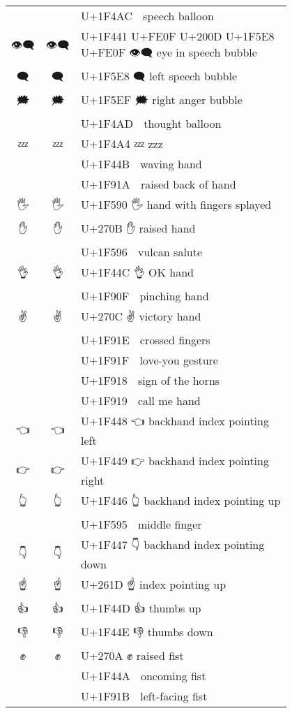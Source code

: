 \documentclass[a4paper,12pt]{ltjarticle}
\newcommand{\fontA}[1]{{\fontspec[RawFeature={mode=harf,+dist,+ccmp}]{Segoe UI Emoji} #1}}
\newcommand{\fontB}[1]{{\fontspec[RawFeature={mode=harf,+dist,+ccmp}]{Noto Color Emoji} #1}}
\begin{document}
\begin{longtable}[c]{ccp{0.8\linewidth}}
\fontA{💬}&\fontB{💬}&U+1F4AC 💬 speech balloon\\
\fontA{👁️‍🗨️}&\fontB{👁️‍🗨️}&U+1F441 U+FE0F U+200D U+1F5E8 U+FE0F 👁️‍🗨️ eye in speech bubble\\
\fontA{🗨}&\fontB{🗨}&U+1F5E8 🗨 left speech bubble\\
\fontA{🗯}&\fontB{🗯}&U+1F5EF 🗯 right anger bubble\\
\fontA{💭}&\fontB{💭}&U+1F4AD 💭 thought balloon\\
\fontA{💤}&\fontB{💤}&U+1F4A4 💤 zzz\\
\fontA{👋}&\fontB{👋}&U+1F44B 👋 waving hand\\
\fontA{🤚}&\fontB{🤚}&U+1F91A 🤚 raised back of hand\\
\fontA{🖐}&\fontB{🖐}&U+1F590 🖐 hand with fingers splayed\\
\fontA{✋}&\fontB{✋}&U+270B ✋ raised hand\\
\fontA{🖖}&\fontB{🖖}&U+1F596 🖖 vulcan salute\\
\fontA{👌}&\fontB{👌}&U+1F44C 👌 OK hand\\
\fontA{🤏}&\fontB{🤏}&U+1F90F 🤏 pinching hand\\
\fontA{✌}&\fontB{✌}&U+270C ✌ victory hand\\
\fontA{🤞}&\fontB{🤞}&U+1F91E 🤞 crossed fingers\\
\fontA{🤟}&\fontB{🤟}&U+1F91F 🤟 love-you gesture\\
\fontA{🤘}&\fontB{🤘}&U+1F918 🤘 sign of the horns\\
\fontA{🤙}&\fontB{🤙}&U+1F919 🤙 call me hand\\
\fontA{👈}&\fontB{👈}&U+1F448 👈 backhand index pointing left\\
\fontA{👉}&\fontB{👉}&U+1F449 👉 backhand index pointing right\\
\fontA{👆}&\fontB{👆}&U+1F446 👆 backhand index pointing up\\
\fontA{🖕}&\fontB{🖕}&U+1F595 🖕 middle finger\\
\fontA{👇}&\fontB{👇}&U+1F447 👇 backhand index pointing down\\
\fontA{☝}&\fontB{☝}&U+261D ☝ index pointing up\\
\fontA{👍}&\fontB{👍}&U+1F44D 👍 thumbs up\\
\fontA{👎}&\fontB{👎}&U+1F44E 👎 thumbs down\\
\fontA{✊}&\fontB{✊}&U+270A ✊ raised fist\\
\fontA{👊}&\fontB{👊}&U+1F44A 👊 oncoming fist\\
\fontA{🤛}&\fontB{🤛}&U+1F91B 🤛 left-facing fist\\

\end{longtable}
\end{document}
